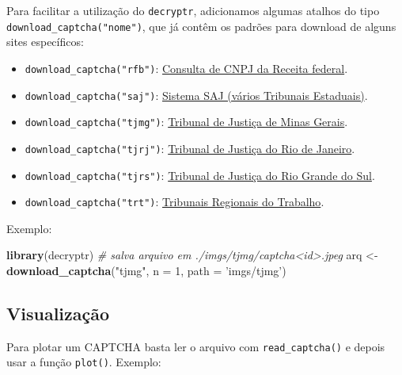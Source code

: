 \documentclass[12pt,]{report}
\newenvironment{Shaded}{\begin{snugshade}}{\end{snugshade}}
\newcommand{\KeywordTok}[1]{\textcolor[rgb]{0.13,0.29,0.53}{\textbf{#1}}}
\newcommand{\DataTypeTok}[1]{\textcolor[rgb]{0.13,0.29,0.53}{#1}}
\newcommand{\DecValTok}[1]{\textcolor[rgb]{0.00,0.00,0.81}{#1}}
\newcommand{\StringTok}[1]{\textcolor[rgb]{0.31,0.60,0.02}{#1}}
\newcommand{\CommentTok}[1]{\textcolor[rgb]{0.56,0.35,0.01}{\textit{#1}}}
\newcommand{\NormalTok}[1]{#1}
\providecommand{\tightlist}{%
  \setlength{\itemsep}{0pt}\setlength{\parskip}{0pt}}
\begin{document}
Para facilitar a utilização do \texttt{decryptr}, adicionamos algumas
atalhos do tipo \texttt{download\_captcha("nome")}, que já contêm os
padrões para download de alguns sites específicos:

\begin{itemize}
\tightlist
\item
  \texttt{download\_captcha("rfb")}:
  \href{http://www.receita.fazenda.gov.br/pessoajuridica/cnpj/cnpjreva/cnpjreva_solicitacao2.asp}{Consulta
  de CNPJ da Receita federal}.
\item
  \texttt{download\_captcha("saj")}:
  \href{https://esaj.tjsp.jus.br/cjsg/imagemCaptcha.do}{Sistema SAJ
  (vários Tribunais Estaduais)}.
\item
  \texttt{download\_captcha("tjmg")}:
  \href{http://www4.tjmg.jus.br/juridico/sf/captcha.svl}{Tribunal de
  Justiça de Minas Gerais}.
\item
  \texttt{download\_captcha("tjrj")}:
  \href{http://www4.tjrj.jus.br/consultaProcessoWebV2/captcha}{Tribunal
  de Justiça do Rio de Janeiro}.
\item
  \texttt{download\_captcha("tjrs")}:
  \href{http://www.tjrs.jus.br/site_php/consulta/human_check/humancheck_showcode.php}{Tribunal
  de Justiça do Rio Grande do Sul}.
\item
  \texttt{download\_captcha("trt")}:
  \href{https://pje.trt3.jus.br/consultaprocessual/seam/resource/captcha}{Tribunais
  Regionais do Trabalho}.
\end{itemize}

Exemplo:

\begin{Shaded}
\begin{Highlighting}[]
\KeywordTok{library}\NormalTok{(decryptr)}
\CommentTok{# salva arquivo em ./imgs/tjmg/captcha<id>.jpeg}
\NormalTok{arq <-}\StringTok{ }\KeywordTok{download_captcha}\NormalTok{(}\StringTok{"tjmg"}\NormalTok{, }\DataTypeTok{n =} \DecValTok{1}\NormalTok{, }\DataTypeTok{path =} \StringTok{'imgs/tjmg'}\NormalTok{) }
\end{Highlighting}
\end{Shaded}

\subsection{Visualização}\label{visualizacao}

Para plotar um CAPTCHA basta ler o arquivo com \texttt{read\_captcha()}
e depois usar a função \texttt{plot()}. Exemplo:
\end{document}
